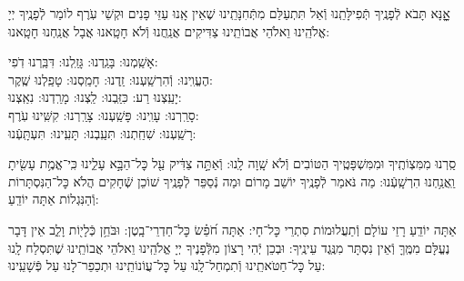 \documentclass[twoside, openany, parskip=half, 11pt]{book}
\begin{document}
אׇׇׇׇָנָּא תָּבֹא לְֿפָנֶֽיךָ תְּֿפִילָּתֵֽנוּ וְֿאַל תִּתְעַלַּם מִתְּֿחִנָּתֵֽינוּ שֶׁאֵין אָֽנוּ עַזֵּי פָנִים וּקְשֵׁי עֹֽרֶף לוֹמַר לְֿפָנֶֽיךָ יְיָ אֱלֹהֵֽינוּ וֵאלֹהֵי אֲבוֹתֵֽינוּ צַדִּיקִים אֲנַֽחֲנוּ וְֿלֹא חָטָֽאנוּ אֲבָל אֲנַֽחְנוּ חָטָֽאנוּ:

אָשַֽׁמְנוּ: בָּגַֽדְנוּ: גָּזַֽלְנוּ: דִּבַּֽרְנוּ דֹֽפִי: \\
הֶעֱוִֽינוּ: וְֿהִרְשַֽׁעְנוּ: זַֽדְנוּ: חָמַֽסְנוּ: טָפַֽלְנוּ שֶֽׁקֶר:\\
יָעַֽצְנוּ רַע: כִּזַּֽבְנוּ: לַֽצְנוּ: מָרַֽדְנוּ: נִאַֽצְנוּ: \\
סָרַֽרְנוּ: עָוִֽינוּ: פָּשַֽׁעְנוּ: צָרַֽרְנוּ: קִשִּֽׁינוּ עֹֽרֶף:\\
רָשַֽׁעְנוּ: שִׁחַֽתְנוּ: תִּעַֽבְנוּ: תָּעִֽינוּ: תִּעְתָּֽעְֿנוּ:

סַֽרְנוּ מִמִּצְוֹתֶֽיךָ וּמִמִּשְׁפָּטֶֽיךָ הַטּוֹבִים וְֿלֹא שָֽׁוָה לָֽנוּ: וְֿאַתָּ֣ה צַדִּ֔יק עַ֖ל כׇּל־הַבָּ֣א עָלֵ֑ינוּ כִּֽי־אֱמֶ֥ת עָשִׂ֖יתָ וַֽאֲנַ֥חְנוּ הִרְשָֽׁעְֿנוּ: מַה נֹּאמַר לְֿפָנֶֽיךָ יוֹשֵׁב מָרוֹם וּמַה נְֿסַפֵּר לְֿפָנֶֽיךָ שׁוֹכֵן שְֿׁחָקִים הֲלֹא כׇּל־הַנִּסְתָּרוֹת וְֿהַנִּגְלוֹת אַתָּה יוֹדֵֽעַ:

אַתָּה יוֹדֵֽעַ רָזֵי עוֹלָם וְֿתַעֲלוּמוֹת סִתְרֵי כׇּל־חָי: אַתָּה חֹ֝פֵ֗שׂ כׇּל־חַדְרֵי־בָֽטֶן: וּבֹּחֵ֥ן כְּֿלָי֖וֹת וָלֵ֑ב אֵין דָּבָר נֶעֱלָּם מִמֶּֽךָּ וְֿאֵין נִסְתָּר מִנֶּֽגֶד עֵינֶֽיךָ: וּבְכֵן יְֿהִי רָצוֹן מִלְּֿפָנֶיךָ יְיָ אֱלֹהֵֽינוּ וֵאלֹהֵי אֲבוֹתֵֽינוּ שֶׁתִּסְלַח לָֽנוּ עַל כׇּל־חַטֹּאתֵֽינוּ וְֿתִמְחַל־לָֽנוּ עַל כׇּל־עֲוֹנוֹתֵֽינוּ וּתְכַפֵר־לָנוּ עַל פְּֿשָׁעֵֽינוּ:
\end{document}
